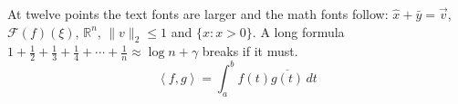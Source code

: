 \documentclass[12pt]{article}
\begin{document}
At twelve points the text fonts are larger and the math fonts follow: $\hat{x} + \bar{y} = \vec{v}$, $\mathcal{F}(f)(\xi)$, $\mathbb{R}^n$, $\|v\|_2 \leq 1$ and $\{x : x > 0\}$. A long formula $1 + \frac{1}{2} + \frac{1}{3} + \frac{1}{4} + \cdots + \frac{1}{n} \approx \log n + \gamma$ breaks if it must.
\begin{equation*}
\left\langle f, g \right\rangle = \int_a^b f(t)\overline{g(t)}\,dt
\end{equation*}
\end{document}
